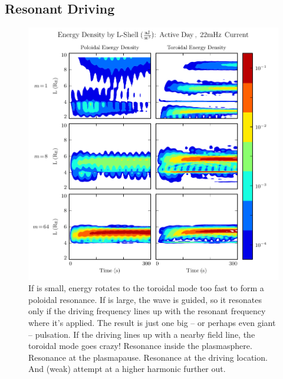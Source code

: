 \subsection{Resonant Driving}

\begin{figure}[H]
    \centering
    \includegraphics[width=\textwidth]{figures/layers_22mHz_1.pdf}
    \caption[Poloidal and Toroidal Energy Distribution: Resonant Driving]{
      If \azm is small, energy rotates to the toroidal mode too fast to form a poloidal resonance. If \azm is large, the \Alfven wave is guided, so it resonates only if the driving frequency lines up with the resonant frequency where it's applied. The result is just one big -- or perhaps even giant -- pulsation. If the driving lines up with a nearby field line, the toroidal mode goes crazy! Resonance inside the plasmasphere. Resonance at the plasmapause. Resonance at the driving location. And (weak) attempt at a higher harmonic further out. 
    }
    \label{fig_resonant_driving}
\end{figure}


